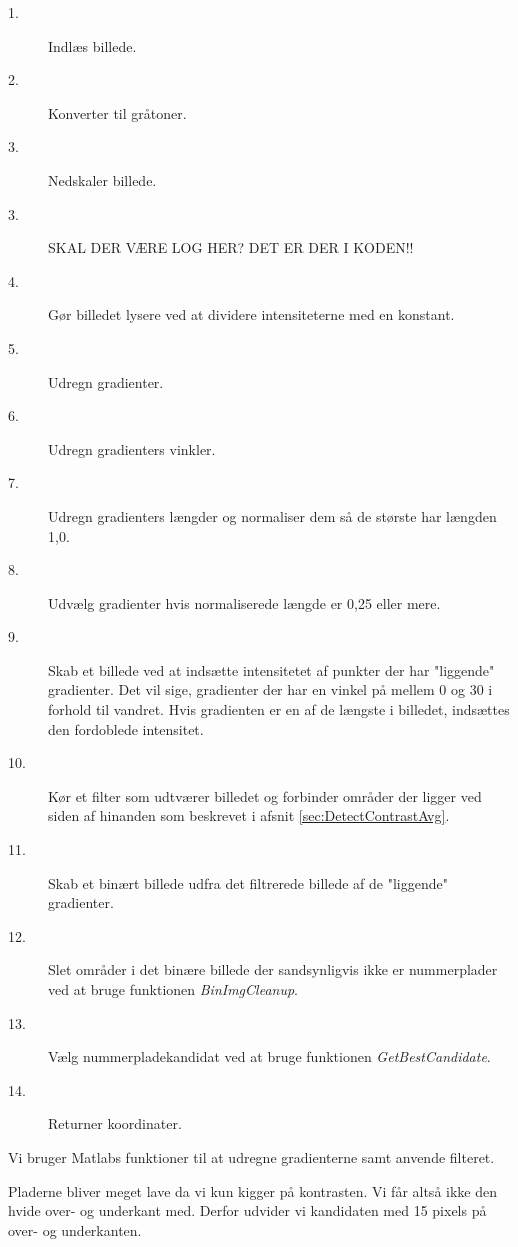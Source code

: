 \begin{description}
\item[1.] Indlæs billede.
\item[2.] Konverter til gråtoner.
\item[3.] Nedskaler billede.
\item[3.] SKAL DER VÆRE LOG HER? DET ER DER I KODEN!!
\item[4.] Gør billedet lysere ved at dividere intensiteterne med en konstant.
\item[5.] Udregn gradienter.
\item[6.] Udregn gradienters vinkler.
\item[7.] Udregn gradienters længder og normaliser dem så de største har længden 1,0.
\item[8.] Udvælg gradienter hvis normaliserede længde er 0,25 eller mere.
\item[9.] Skab et billede ved at indsætte intensitetet af punkter der har "liggende" gradienter. Det vil sige, gradienter der har en vinkel på mellem 0 og 30 i forhold til vandret. Hvis gradienten er en af de længste i billedet, indsættes den fordoblede intensitet.
\item[10.] Kør et filter som udtværer billedet og forbinder områder der ligger ved siden af hinanden som beskrevet i afsnit \ref{sec:DetectContrastAvg}.
\item[11.] Skab et binært billede udfra det filtrerede billede af de "liggende" gradienter. 
\item[12.] Slet områder i det binære billede der sandsynligvis ikke er nummerplader ved at bruge funktionen \textit{BinImgCleanup}.
\item[13.] Vælg nummerpladekandidat ved at bruge funktionen \textit{GetBestCandidate}.
\item[14.] Returner koordinater.
\end{description}

Vi bruger Matlabs funktioner til at udregne gradienterne samt anvende filteret.


Pladerne bliver meget lave da vi kun kigger på kontrasten. Vi får altså ikke den hvide over- og underkant med. Derfor udvider vi kandidaten med 15 pixels på over- og underkanten. 


